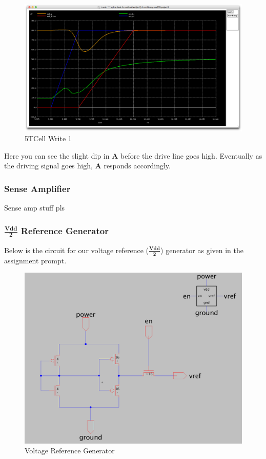 \documentclass[a4paper]{article}
\begin{document}
 \begin{figure}[H]
	\centering
	\includegraphics[scale=0.12]{5TWrite1}
	\caption{5TCell Write 1}
	\label{fig:5TWrite1}
\end{figure}

Here you can see the slight dip in \textbf{A} before the drive line goes high. Eventually as the driving signal goes high, \textbf{A} responds accordingly.\\

\subsubsection{Sense Amplifier}
Sense amp stuff pls
\subsubsection{$\frac{\textbf{Vdd}}{\textbf{2}}$ Reference Generator}
Below is the circuit for our voltage reference ($\frac{\textbf{Vdd}}{\textbf{2}}$) generator as given in the assignment prompt.

\begin{figure}[H]
	\centering
	\includegraphics[scale=0.12]{vRefGen}
	\caption{Voltage Reference Generator}
	\label{fig:vRefGen}
\end{figure}
\end{document}

